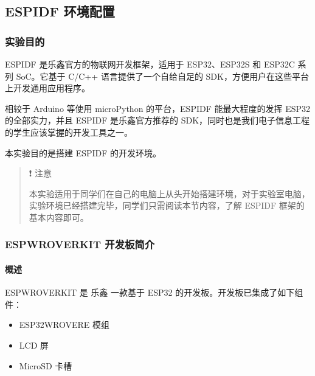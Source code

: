 \documentclass[a4paper,12pt,english]{sphinxmanual}
\begin{document}
\sphinxstepscope


\subsection{ESP\sphinxhyphen{}IDF 环境配置}
\label{\detokenize{exp-esp32/ide/esp-idf-setup:esp-idf}}\label{\detokenize{exp-esp32/ide/esp-idf-setup::doc}}

\subsubsection{实验目的}
\label{\detokenize{exp-esp32/ide/esp-idf-setup:id1}}
\sphinxAtStartPar
ESP\sphinxhyphen{}IDF 是乐鑫官方的物联网开发框架，适用于 ESP32、ESP32\sphinxhyphen{}S 和 ESP32\sphinxhyphen{}C 系列 SoC。它基于 C/C++ 语言提供了一个自给自足的 SDK，方便用户在这些平台上开发通用应用程序。

\sphinxAtStartPar
相较于 Arduino 等使用 microPython 的平台，ESP\sphinxhyphen{}IDF 能最大程度的发挥 ESP32 的全部实力，并且 ESP\sphinxhyphen{}IDF 是乐鑫官方推荐的 SDK，同时也是我们电子信息工程的学生应该掌握的开发工具之一。

\sphinxAtStartPar
本实验目的是搭建 ESP\sphinxhyphen{}IDF 的开发环境。
\begin{quote}

\sphinxAtStartPar
❗ 注意

\sphinxAtStartPar
本实验适用于同学们在自己的电脑上从头开始搭建环境，对于实验室电脑，实验环境已经搭建完毕，同学们只需阅读本节内容，了解 ESP\sphinxhyphen{}IDF 框架的基本内容即可。
\end{quote}


\subsubsection{ESP\sphinxhyphen{}WROVER\sphinxhyphen{}KIT 开发板简介}
\label{\detokenize{exp-esp32/ide/esp-idf-setup:esp-wrover-kit}}

\paragraph{概述}
\label{\detokenize{exp-esp32/ide/esp-idf-setup:id2}}
\sphinxAtStartPar
ESP\sphinxhyphen{}WROVER\sphinxhyphen{}KIT 是 乐鑫 一款基于 ESP32 的开发板。开发板已集成了如下组件：
\begin{itemize}
\item {} 
\sphinxAtStartPar
ESP32\sphinxhyphen{}WROVER\sphinxhyphen{}E 模组

\item {} 
\sphinxAtStartPar
LCD 屏

\item {} 
\sphinxAtStartPar
MicroSD 卡槽

\end{itemize}
\end{document}
